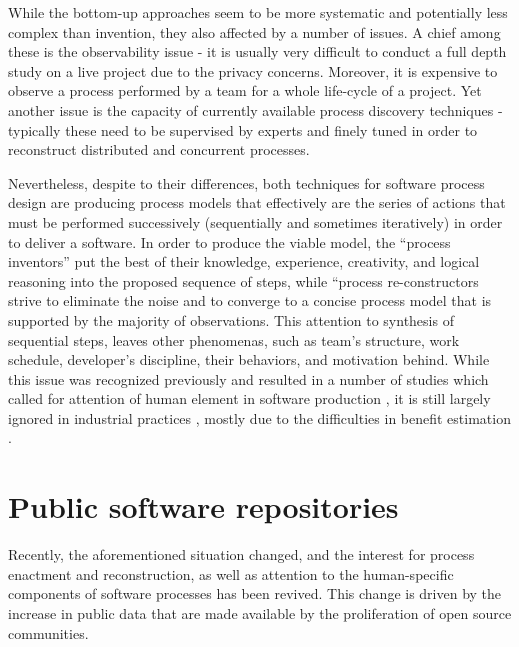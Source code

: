 While the bottom-up approaches seem to be more systematic and potentially less complex than invention, 
they also affected by a number of issues. A chief among these is the observability issue - 
it is usually very difficult to conduct a full depth study on a live project due to the privacy concerns. 
Moreover, it is expensive to observe a process performed by a team for a whole life-cycle of a project. 
Yet another issue is the capacity of currently available process discovery techniques - 
typically these need to be supervised by experts and finely tuned in order to reconstruct 
distributed and concurrent processes. 

Nevertheless, despite to their differences, both techniques for software process design are 
producing process models that effectively are the series of actions that must be performed successively 
(sequentially and sometimes iteratively) in order to deliver a software. 
In order to produce the viable model, the ``process inventors'' put the best of their knowledge, experience,
creativity, and logical reasoning into the proposed sequence of steps, while ``process re-constructors 
strive to eliminate the noise and to converge to a concise process model that is supported by the 
majority of observations. 
This attention to synthesis of sequential steps, leaves other phenomenas, such as team's structure, work schedule, 
developer's discipline, their behaviors, and motivation behind. While this issue was recognized previously
and resulted in a number of studies which called for attention of human element in software production 
\cite{citeulike:149387} \cite{citeulike:113403} \cite{citeulike:205322} \cite{citeulike:12798652}, 
it is still largely ignored in industrial practices \cite{citeulike:12798659}, mostly due to the 
difficulties in benefit estimation \cite{citeulike:12798662} \cite{csdl2-12-11}.

%
%
\section{Public software repositories}\label{section_public_repositories}
Recently, the aforementioned situation changed, and the interest for process enactment and reconstruction, 
as well as attention to the human-specific components of software processes has been revived. 
This change is driven by the increase in public data that are made available by the proliferation of open 
source communities.

